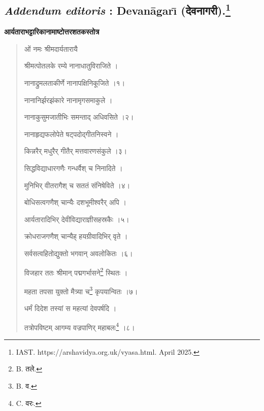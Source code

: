 \documentclass[a4paper, 11pt, oneside, french, landscape, twocolumn]{article}
\begin{document}
\subsection[\emph{Addendum editoris} : Devan\={a}gar\={\i} \texthindi{(देवनागरी)}.]{\emph{Addendum editoris} : Devan\={a}gar\={\i} \texthindi{(देवनागरी)}.\footnote{IAST. https://arshavidya.org.uk/vyasa.html. April 2025.}}
\begin{center}
\textbf{\texthindi{आर्यताराभट्टारिकानामाष्टोत्तरशतकस्तोत्र}}
\end{center}
\begin{quotation}\scriptsize
\texthindi{ओं नमः श्रीमदार्यतारायै}

\bigskip

\texthindi{श्रीमत्पोतलके रम्ये नानाधातुविराजिते ।}

\texthindi{नानाद्रुमलताकीर्णे नानापक्षिनिकूजिते ।१।}

\bigskip

\texthindi{नानानिर्झरझंकारे नानामृगसमाकुले ।}

\texthindi{नानाकुसुमजातीभिः समन्ताद् अधिवसिते ।२।}

\bigskip

\texthindi{नानाहृद्यफलोपेते षट्पदोद्गीतनिस्वने ।}

\texthindi{किन्नरैर् मधुरैर् गीतैर् मत्तवारणसंकुले ।३।}

\bigskip

\texthindi{सिद्धविद्याधारगणैः गन्धर्वैश् च निनादिते ।}

\texthindi{मुनिभिर् वीतरागैश् च सततं संनिषेविते ।४।}

\bigskip

\texthindi{बोधिसत्वगणैश् चान्यैः दशभूमीश्वरैर् अपि ।}

\texthindi{आर्यतारादिभिर् देवीविद्याराज्ञीसहस्रकैः ।५।}

\bigskip

\texthindi{क्रोधराजगणैश् चान्यैह् हयग्रीवादिभिर् वृते ।}

\texthindi{सर्वसत्वहितोद्युक्तो भगवान् अवलोकितः ।६।}

\bigskip

\texthindi{विजहार ततः श्रीमान् पद्मगर्भासने}\footnote{B. \texthindi{तले}.} \texthindi{स्थितः ।}

\texthindi{महता तपसा युक्तो मैत्र्या च}\footnote{B. \texthindi{व}.} \texthindi{कृपयान्वितः ।७।}

\bigskip

\texthindi{धर्मं दिदेश तस्यां स महत्यां देवपर्षदि ।}

\texthindi{तत्रोपविष्टम् आगम्य वज्रपाणिर् महाबलः}\footnote{C. \texthindi{वरः}.} \texthindi{।८।}


\end{quotation}
\end{document}
